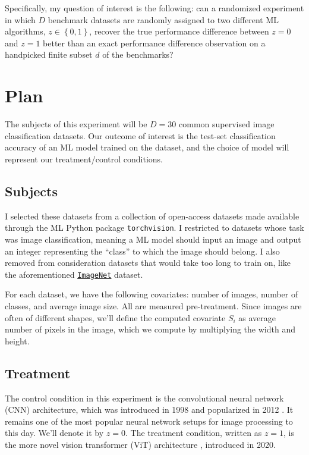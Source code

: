 \documentclass[11pt, oneside]{article}
\newcommand{\dataset}[2]{
    \href{#2}{\texttt{#1}}
}
\newcommand{\ImageNet}{\dataset{ImageNet}{https://www.image-net.org/about.php}}
\begin{document}
Specifically, my question of interest is the following: can a randomized
experiment in which $D$ benchmark datasets are randomly assigned to two
different ML algorithms, $z \in \left\{ 0, 1 \right\}$, recover the true
performance difference between $z = 0$ and $z = 1$ better than an exact
performance difference observation on a handpicked finite subset $d$ of the
benchmarks?

\section*{Plan}

The subjects of this experiment will be $D = 30$ common supervised image
classification datasets. Our outcome of interest is the test-set classification
accuracy of an ML model trained on the dataset, and the choice of model will
represent our treatment/control conditions.

\subsection*{Subjects}
I selected these datasets from a collection of open-access datasets made available
through the ML Python package \texttt{torchvision}. I restricted to datasets
whose task was image classification, meaning a ML model should input an image
and output an integer representing the ``class'' to which the image should
belong. I also removed from consideration datasets that would take too long to
train on, like the aforementioned \ImageNet dataset.

For each dataset, we have the following covariates: number of images, number of
classes, and average image size. All are measured pre-treatment. Since images
are often of different shapes, we'll define the computed covariate $S_i$ as
average number of pixels in the image, which we compute by multiplying the
width and height.


\subsection*{Treatment}
The control condition in this experiment is the convolutional neural network
(CNN) architecture, which was introduced in 1998
\cite{lecunGradientbasedLearningApplied1998} and popularized in 2012
\cite{krizhevskyImageNetClassificationDeep2012}. It remains one of the most
popular neural network setups for image processing to this day. We'll denote it
by $z = 0$. The treatment condition, written as $z = 1$, is the more novel
vision transformer (ViT) architecture \cite{dosovitskiyImageWorth16x162021},
introduced in 2020.
\end{document}
